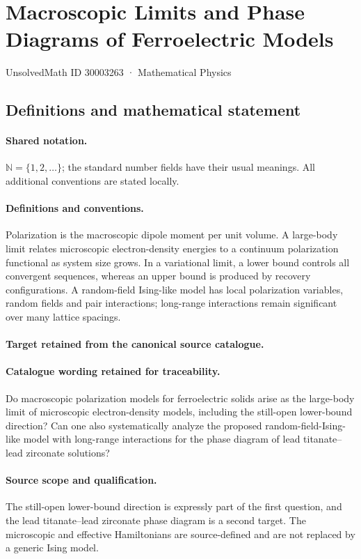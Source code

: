 \documentclass[11pt]{article}
\begin{document}
\setcounter{section}{30003262}
\section{Macroscopic Limits and Phase Diagrams of Ferroelectric Models}\label{30003263}
{\small UnsolvedMath ID 30003263 · Mathematical Physics}
\subsection{Definitions and mathematical statement}

\paragraph{Shared notation.}$\mathbb N=\{1,2,\ldots\}$; the standard number fields have their usual meanings. All additional conventions are stated locally.


\paragraph{Definitions and conventions.}
Polarization is the macroscopic dipole moment per unit volume. A large-body limit relates microscopic electron-density energies to a continuum polarization functional as system size grows. In a variational limit, a lower bound controls all convergent sequences, whereas an upper bound is produced by recovery configurations. A random-field Ising-like model has local polarization variables, random fields and pair interactions; long-range interactions remain significant over many lattice spacings.

\paragraph{Target retained from the canonical source catalogue.}
\paragraph{Catalogue wording retained for traceability.}
Do macroscopic polarization models for ferroelectric solids arise as the large-body limit of microscopic electron-density models, including the still-open lower-bound direction? Can one also systematically analyze the proposed random-field-Ising-like model with long-range interactions for the phase diagram of lead titanate–lead zirconate solutions?

\paragraph{Source scope and qualification.}
The still-open lower-bound direction is expressly part of the first question, and the lead titanate--lead zirconate phase diagram is a second target. The microscopic and effective Hamiltonians are source-defined and are not replaced by a generic Ising model.
\end{document}
